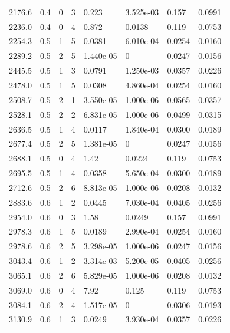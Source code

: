 \documentclass[preview]{standalone}
\begin{document}
{{{\begin{tabular}{L{1.2cm}C{1.2cm} C{0.3cm}C{0.5cm} C{1.4cm}C{1.4cm} C{1.4cm}C{1.4cm}}
  2176.6  &   0.4  & 0     &  3 &  0.223  & 3.525e-03  & 0.157 &  0.0991   \\ 
  2236.0  &   0.4  & 0     &  4 &  0.872  & 0.0138  & 0.119 &  0.0753   \\ 
  2254.3  &   0.5  & 1     &  5 &  0.0381  & 6.010e-04  & 0.0254 &  0.0160   \\ 
  2289.2  &   0.5  & 2     &  5 &  1.440e-05  & 0  & 0.0247 &  0.0156   \\ 
  2445.5  &   0.5  & 1     &  3 &  0.0791  & 1.250e-03  & 0.0357 &  0.0226   \\ 
  2478.0  &   0.5  & 1     &  5 &  0.0308  & 4.860e-04  & 0.0254 &  0.0160   \\ 
  2508.7  &   0.5  & 2     &  1 &  3.550e-05  & 1.000e-06  & 0.0565 &  0.0357   \\ 
  2528.1  &   0.5  & 2     &  2 &  6.831e-05  & 1.000e-06  & 0.0499 &  0.0315   \\ 
  2636.5  &   0.5  & 1     &  4 &  0.0117  & 1.840e-04  & 0.0300 &  0.0189   \\ 
  2677.4  &   0.5  & 2     &  5 &  1.381e-05  & 0  & 0.0247 &  0.0156   \\ 
  2688.1  &   0.5  & 0     &  4 &  1.42  & 0.0224  & 0.119 &  0.0753   \\ 
  2695.5  &   0.5  & 1     &  4 &  0.0358  & 5.650e-04  & 0.0300 &  0.0189   \\ 
  2712.6  &   0.5  & 2     &  6 &  8.813e-05  & 1.000e-06  & 0.0208 &  0.0132   \\ 
  2883.6  &   0.6  & 1     &  2 &  0.0445  & 7.030e-04  & 0.0405 &  0.0256   \\ 
  2954.0  &   0.6  & 0     &  3 &  1.58  & 0.0249  & 0.157 &  0.0991   \\ 
  2978.3  &   0.6  & 1     &  5 &  0.0189  & 2.990e-04  & 0.0254 &  0.0160   \\ 
  2978.6  &   0.6  & 2     &  5 &  3.298e-05  & 1.000e-06  & 0.0247 &  0.0156   \\ 
  3043.4  &   0.6  & 1     &  2 &  3.314e-03  & 5.200e-05  & 0.0405 &  0.0256   \\ 
  3065.1  &   0.6  & 2     &  6 &  5.829e-05  & 1.000e-06  & 0.0208 &  0.0132   \\ 
  3069.0  &   0.6  & 0     &  4 &  7.92  & 0.125  & 0.119 &  0.0753   \\ 
  3084.1  &   0.6  & 2     &  4 &  1.517e-05  & 0  & 0.0306 &  0.0193   \\ 
  3130.9  &   0.6  & 1     &  3 &  0.0249  & 3.930e-04  & 0.0357 &  0.0226   \\ 

\end{tabular}}}}
\end{document}
